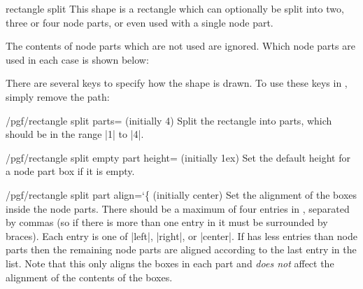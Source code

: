 \begin{shape}{rectangle split}
  This shape is a rectangle which can optionally be split into 
  two, three or four node parts, or even used with a single node 
  part. 

\begin{codeexample}[]
\end{codeexample} 

  
  The contents of node parts which are not used are ignored. 
  Which node parts are used in each case is shown below:

\begin{codeexample}[]
\end{codeexample} 

  There are several \pgfname{} keys to specify how the shape is
  drawn. To use these keys in \tikzname, simply remove the 
   path:
  
  \begin{key}{/pgf/rectangle split parts= (initially 4)}
    Split the rectangle into  parts, 
    which should be in the range |1| to |4|.
  \end{key}
  
  \begin{key}{/pgf/rectangle split empty part height= (initially 1ex)}
    Set the default height for a node part box if it is empty.
  \end{key}
  
  \begin{key}{/pgf/rectangle split part align={\ttfamily\char`\{} (initially center)}
  	Set the alignment of the boxes inside the node parts.
  	There should be a maximum of four entries in , 
  	separated by commas (so if there is more than one entry in 
  	 it must be surrounded by braces).
  	Each entry is one of |left|,
    |right|, or |center|. If  has less entries than 
    node parts then the remaining node parts are aligned according to 
    the last entry in the list.    
    Note that this only aligns the boxes in each part and \emph{does not} 
    affect the alignment of the contents of the boxes.
    

\end{key}
\end{shape}
